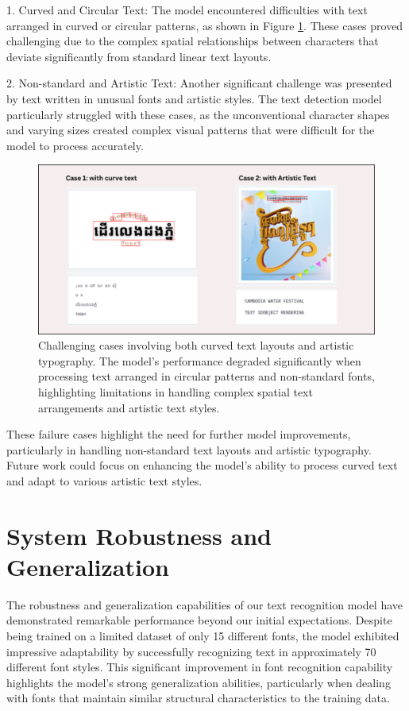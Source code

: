 1. Curved and Circular Text: The model encountered difficulties with text arranged in curved or circular patterns, as shown in Figure \ref{fig:test-case}. These cases proved challenging due to the complex spatial relationships between characters that deviate significantly from standard linear text layouts.

2. Non-standard and Artistic Text: Another significant challenge was presented by text written in unusual fonts and artistic styles. The text detection model particularly struggled with these cases, as the unconventional character shapes and varying sizes created complex visual patterns that were difficult for the model to process accurately.

\begin{figure}[ht]
    \centering
    \includegraphics[width=\textwidth]{figures/test_case.png}
    \caption{Challenging cases involving both curved text layouts and artistic typography. 
    The model's performance degraded significantly when processing text arranged in circular 
    patterns and non-standard fonts, highlighting limitations in handling complex spatial 
    text arrangements and artistic text styles.}
    \label{fig:test-case}
\end{figure}

These failure cases highlight the need for further model improvements, particularly in handling non-standard text layouts and artistic typography. Future work could focus on enhancing the model's ability to process curved text and adapt to various artistic text styles.

\section{System Robustness and Generalization}
\label{sec:robustness}
The robustness and generalization capabilities of our text recognition model have demonstrated 
remarkable performance beyond our initial expectations. Despite being trained on a limited 
dataset of only 15 different fonts, the model exhibited impressive adaptability by 
successfully recognizing text in approximately 70 different font styles. This significant 
improvement in font recognition capability highlights the model's strong generalization 
abilities, particularly when dealing with fonts that maintain similar structural characteristics 
to the training data.

